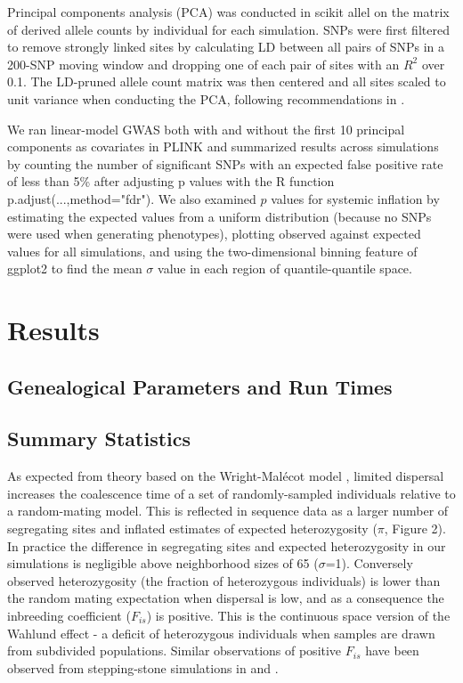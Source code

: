 \documentclass[9pt,twocolumn,twoside,lineno]{gsajnl}
\begin{document}
Principal components analysis (PCA) was conducted in scikit allel on the matrix of derived allele counts by individual for each simulation. SNPs were first filtered to remove strongly linked sites by calculating LD between all pairs of SNPs in a 200-SNP moving window and dropping one of each pair of sites with an $R^2$ over 0.1. The LD-pruned allele count matrix was then centered and all sites scaled to unit variance when conducting the PCA, following recommendations in \citep{Patterson2006}.   

We ran linear-model GWAS both with and without the first 10 principal components as covariates in PLINK and summarized results across simulations by counting the number of significant SNPs with an expected false positive rate of less than 5\% after adjusting p values with the R function p.adjust(...,method="fdr"). We also examined $p$ values for systemic inflation by estimating the expected values from a uniform distribution (because no SNPs were used when generating phenotypes), plotting observed against expected values for all simulations, and using the two-dimensional binning feature of ggplot2 \citep{Wickham2016} to find the mean $\sigma$ value in each region of quantile-quantile space. 

\section{Results}

\subsection{Genealogical Parameters and Run Times}

\subsection{Summary Statistics}
As expected from theory based on the Wright-Malécot model \citep{Maruyama1972}, limited dispersal increases the coalescence time of a set of randomly-sampled individuals relative to a random-mating model. This is reflected in sequence data as a larger number of segregating sites and inflated estimates of expected heterozygosity ($\pi$, Figure 2). In practice the difference in segregating sites and expected heterozygosity in our simulations is negligible above neighborhood sizes of 65 ($\sigma$=1). Conversely observed heterozygosity (the fraction of heterozygous individuals) is lower than the random mating expectation when dispersal is low, and as a consequence the inbreeding coefficient ($F_{is}$) is positive. This is the continuous space version of the Wahlund effect \citep{Wahlund1928} - a deficit of heterozygous individuals when samples are drawn from subdivided populations. Similar observations of positive $F_{is}$ have been observed from stepping-stone simulations in \citep{Shirk2014} and \citep{Neel2013}.  
\end{document}
